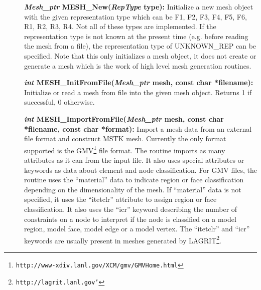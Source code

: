 \documentclass[12pt]{article}
\begin{document}
 
\begin{description}
\item[]\textbf{\textit{Mesh\_ptr} MESH\_New(\textit{RepType} type):}
Initialize a new mesh object with the given representation type which
can be F1, F2, F3, F4, F5, F6, R1, R2, R3, R4. Not all of these types
are implemented. If the representation type is not known at the
present time (e.g. before reading the mesh from a file), the
representation type of UNKNOWN\_REP can be specified.  Note that this
only initializes a mesh object, it does not create or generate a mesh
which is the work of high level mesh generation routines.

\item[]\textbf{\textit{int} MESH\_InitFromFile(\textit{Mesh\_ptr} mesh,
const char *filename):} Initialize or read a mesh from file into the
given mesh object. Returns 1 if successful, 0 otherwise.

\item[]\textbf{\textit{int} MESH\_ImportFromFile(\textit{Mesh\_ptr}
    mesh, const char *filename, const char *format):} Import a mesh
  data from an external file format and construct MSTK mesh. Currently
  the only format supported is the
  GMV\footnote{\texttt{http://www-xdiv.lanl.gov/XCM/gmv/GMVHome.html}}
  file format. The routine imports as many attributes as it can from
  the input file. It also uses special attributes or keywords as data
  about element and node classification.  For GMV files, the routine
  uses the ``material'' data to indicate region or face classification
  depending on the dimensionality of the mesh. If ``material'' data is
  not specified, it uses the ``itetclr'' attribute to assign region or
  face classification. It also uses the ``icr'' keyword describing the
  number of constraints on a node to interpret if the node is
  classified on a model region, model face, model edge or a model
  vertex. The ``itetclr'' and ``icr'' keywords are usually present in
  meshes generated by
  LAGRIT\footnote{\texttt{http://lagrit.lanl.gov'}}.


\end{description}
\end{document}
